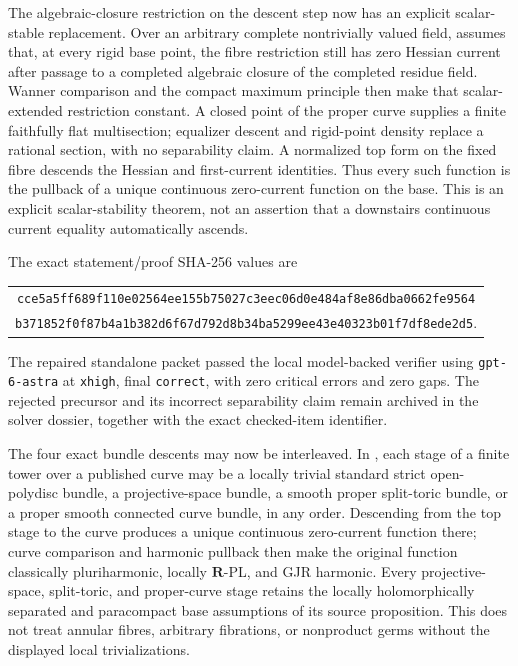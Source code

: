 The algebraic-closure restriction on the descent step now has an explicit
scalar-stable replacement.  Over an arbitrary complete nontrivially valued
field,  assumes
that, at every rigid base point, the fibre restriction still has zero
Hessian current after passage to a completed algebraic closure of the
completed residue field.  Wanner comparison and the compact maximum
principle then make that scalar-extended restriction constant.  A closed
point of the proper curve supplies a finite faithfully flat multisection;
equalizer descent and rigid-point density replace a rational section, with
no separability claim.  A normalized top form on the fixed fibre descends
the Hessian and first-current identities.  Thus every such function is the
pullback of a unique continuous zero-current function on the base.  This is
an explicit scalar-stability theorem, not an assertion that a downstairs
continuous current equality automatically ascends.

The exact statement/proof SHA-256 values are
\begin{center}
\small
\begin{tabular}{@{}c@{}}
\nolinkurl{cce5a5ff689f110e02564ee155b75027c3eec06d0e484af8e86dba0662fe9564}\\
\nolinkurl{b371852f0f87b4a1b382d6f67d792d8b34ba5299ee43e40323b01f7df8ede2d5}.
\end{tabular}
\end{center}
The repaired standalone packet passed the local model-backed verifier using
\texttt{gpt-6-astra} at \texttt{xhigh}, final \texttt{correct}, with zero
critical errors and zero gaps.  The rejected precursor and its incorrect
separability claim remain archived in the solver dossier, together with the
exact checked-item identifier.

The four exact bundle descents may now be interleaved.  In
, each stage of a finite
tower over a published curve may be a locally trivial standard strict
open-polydisc bundle, a projective-space bundle, a smooth proper split-toric
bundle, or a proper smooth connected curve bundle, in any order.  Descending
from the top stage to the curve
produces a unique continuous zero-current function there; curve comparison
and harmonic pullback then make the original function classically
pluriharmonic, locally \(\mathbf R\)-PL, and GJR harmonic.  Every
projective-space, split-toric, and proper-curve stage retains the locally
holomorphically separated and paracompact base assumptions of its source
proposition.  This
does not treat annular fibres, arbitrary fibrations, or nonproduct germs
without the displayed local trivializations.

